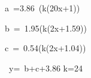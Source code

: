 a\ =3.86\cdot\ \cos\left(k\left(2\pi\cdot0x+1\pi\right)\right)

b\ =\ 1.95\cdot\sin\left(k\left(2\pi{}\cdot x+1.59\pi\right)\right)

c\ =\ 0.54\cdot\sin\left(k\left(2\pi{}\cdot x+1.04\pi\right)\right)

\ y=\ b+c+3.86
k=24